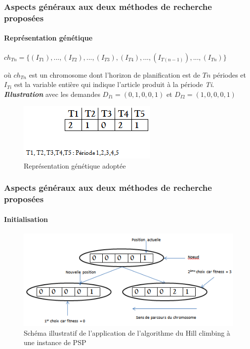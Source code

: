 \documentclass[11pt]{beamer}
\begin{document}
 \begin{frame}
 \frametitle{Aspects généraux aux deux méthodes de recherche proposées}
 \framesubtitle{Représentation génétique}
	
	\begin{center}
		$ch_{Tn} = \{(I_{T1}),..., (I_{T2}),..., (I_{T3}), (I_{T4}),...,(I_{T(n-1)}),...,  (I_{Tn})\}$ \\
	\end{center}
	\hspace*{.5cm} où $ch_{Tn}$ est un chromosome dont l'horizon de planification est de $Tn$ périodes et $I_{Ti}$ est la variable entière qui indique l'article produit à la période \emph{Ti}.  \\
	
	\hspace*{.5cm} \textsl{\textbf{Illustration}} avec les demandes $D_{I1} = (0,1,0,0,1)$ et $D_{I2} = (1,0,0,0,1)$ 
 \begin{figure}[!h]
		\begin{center}
			\includegraphics[scale=.5]{img/adopt_gene_repr.png}
			\caption{Représentation génétique adoptée}
			\label{fig:adopt_gene_repr}
		\end{center}
 \end{figure}
 \end{frame}
 
 \begin{frame}
 \transsplithorizontalout
 \frametitle{Aspects généraux aux deux méthodes de recherche proposées}
 \framesubtitle{Initialisation}
	\begin{figure}[!h]
		\begin{center}
			\includegraphics[scale=.5
			]{img/hill_climbing_fig.png}
			\caption{Schéma illustratif de l'application de l'algorithme du Hill climbing à une instance de PSP}
		\end{center}
 \end{figure}
	
 \end{frame}
 
\end{document}
